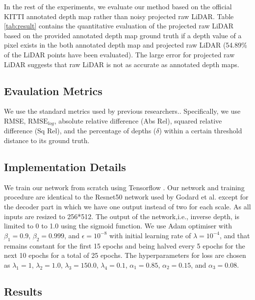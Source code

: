 \documentclass[letterpaper, 10 pt, conference]{ieeeconf}
\begin{document}
In the rest of the experiments, we evaluate our method based on the official KITTI annotated depth map rather than noisy projected raw LiDAR. Table \ref{tab:result} contains the quantitative evaluation of the projected raw LiDAR based on the provided annotated depth map ground truth if a depth value of a pixel exists in the both annotated depth map and projected raw LiDAR (54.89\% of the LiDAR points have been evaluated). The large error for projected raw LiDAR suggests that raw LiDAR is not as accurate as annotated depth maps. 
 

\subsection{Evaulation Metrics}
We use the standard metrics used by previous researchers.\cite{eigen2014depth,kuznietsov2017semi,godard2017unsupervised}. Specifically, we use RMSE, $\text{RMSE}_{log}$, absolute relative difference (Abs Rel), squared relative difference (Sq Rel), and the percentage of depths ($\delta$) within a certain threshold distance to its ground truth.   






\subsection{Implementation Details}
We train our network from scratch using Tensorflow \cite{abadi2016tensorflow}. Our network and training procedure are identical to the Resnet50 network used by Godard et al.\cite{godard2017unsupervised} except for the decoder part in which we have one output instead of two for each scale. As \cite{godard2017unsupervised} all inputs are resized to 256*512. The output of the network,i.e., inverse depth, is limited to 0 to 1.0 using the sigmoid function. We use Adam optimiser \cite{kingma2014adam} with $\beta _{1} = 0.9$, $\beta _{2} = 0.999$, and $\epsilon = 10^{-8}$ with initial learning rate of $\lambda = 10^{-4}$, and that remains constant for the first 15 epochs and being halved every 5 epochs for the next 10 epochs for a total of 25 epochs. The hyperparameters for loss are chosen as $\lambda _{1}=1$, $\lambda _{2}= 1.0$, $\lambda _{3} = 150.0$, $\lambda _{4} = 0.1$, $\alpha _{1} = 0.85$, $\alpha _{2} = 0.15$, and  $\alpha _{3}=0.08$.

\subsection{Results} \label{sec:result} 
\end{document}
